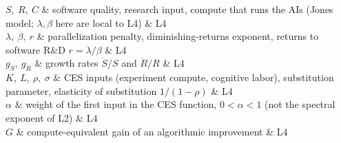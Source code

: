 \begin{notationchunk}
$S,\ R,\ C$ & software quality, research input, compute that runs the AIs (Jones model; $\lambda,\beta$ here are local to L4) & L4\\
$\lambda,\ \beta,\ r$ & parallelization penalty, diminishing-returns exponent, returns to software R\&D $r=\lambda/\beta$ & L4\\
$g_S,\ g_R$ & growth rates $\dot S/S$ and $\dot R/R$ & L4\\
$K,\ L,\ \rho,\ \sigma$ & CES inputs (experiment compute, cognitive labor), substitution parameter, elasticity of substitution $1/(1-\rho)$ & L4\\
$\alpha$ & weight of the first input in the CES function, $0<\alpha<1$ (not the spectral exponent of L2) & L4\\
$G$ & compute-equivalent gain of an algorithmic improvement & L4\\
\end{notationchunk}

\normalsize

